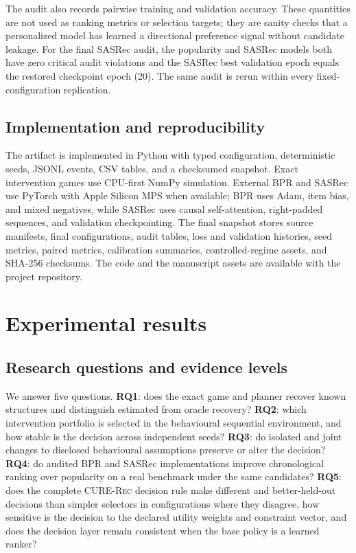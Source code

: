 \documentclass[pdflatex,sn-mathphys-num]{sn-jnl}
\theoremstyle{thmstyleone}
\theoremstyle{thmstyletwo}
\theoremstyle{thmstylethree}
\newcommand{\CURE}{\textsc{CURE-Rec}}
\begin{document}
The audit also records pairwise training and validation accuracy. These quantities are not used as ranking metrics or selection targets; they are sanity checks that a personalized model has learned a directional preference signal without candidate leakage. For the final SASRec audit, the popularity and SASRec models both have zero critical audit violations and the SASRec best validation epoch equals the restored checkpoint epoch (20). The same audit is rerun within every fixed-configuration replication.

\subsection{Implementation and reproducibility}

The artifact is implemented in Python with typed configuration, deterministic seeds, JSONL events, CSV tables, and a checksumed snapshot. Exact intervention games use CPU-first NumPy simulation. External BPR and SASRec use PyTorch with Apple Silicon MPS when available; BPR uses Adam, item bias, and mixed negatives, while SASRec uses causal self-attention, right-padded sequences, and validation checkpointing. The final snapshot stores source manifests, final configurations, audit tables, loss and validation histories, seed metrics, paired metrics, calibration summaries, controlled-regime assets, and SHA-256 checksums. The code and the manuscript assets are available with the project repository.

\section{Experimental results}\label{sec:results}

\subsection{Research questions and evidence levels}

We answer five questions. \textbf{RQ1}: does the exact game and planner recover known structures and distinguish estimated from oracle recovery? \textbf{RQ2}: which intervention portfolio is selected in the behavioural sequential environment, and how stable is the decision across independent seeds? \textbf{RQ3}: do isolated and joint changes to disclosed behavioural assumptions preserve or alter the decision? \textbf{RQ4}: do audited BPR and SASRec implementations improve chronological ranking over popularity on a real benchmark under the same candidates? \textbf{RQ5}: does the complete \CURE{} decision rule make different and better-held-out decisions than simpler selectors in configurations where they disagree, how sensitive is the decision to the declared utility weights and constraint vector, and does the decision layer remain consistent when the base policy is a learned ranker?
\end{document}

